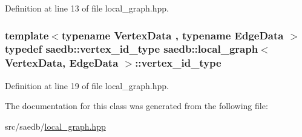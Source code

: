Definition at line 13 of file local\-\_\-graph.\-hpp.

\hypertarget{classsaedb_1_1local__graph_ad6685eb4027c1d0c86d6660ab382fe55}{
\subsubsection[{vertex\-\_\-id\-\_\-type}]{\setlength{\rightskip}{0pt plus 5cm}template$<$typename Vertex\-Data , typename Edge\-Data $>$ typedef {\bf saedb\-::vertex\-\_\-id\-\_\-type} {\bf saedb\-::local\-\_\-graph}$<$ Vertex\-Data, Edge\-Data $>$\-::{\bf vertex\-\_\-id\-\_\-type}}}\label{d9/d4a/classsaedb_1_1local__graph_ad6685eb4027c1d0c86d6660ab382fe55}


Definition at line 19 of file local\-\_\-graph.\-hpp.



The documentation for this class was generated from the following file\-:\begin{DoxyCompactItemize}
\item 
src/saedb/\hyperlink{local__graph_8hpp}{local\-\_\-graph.\-hpp}\end{DoxyCompactItemize}
